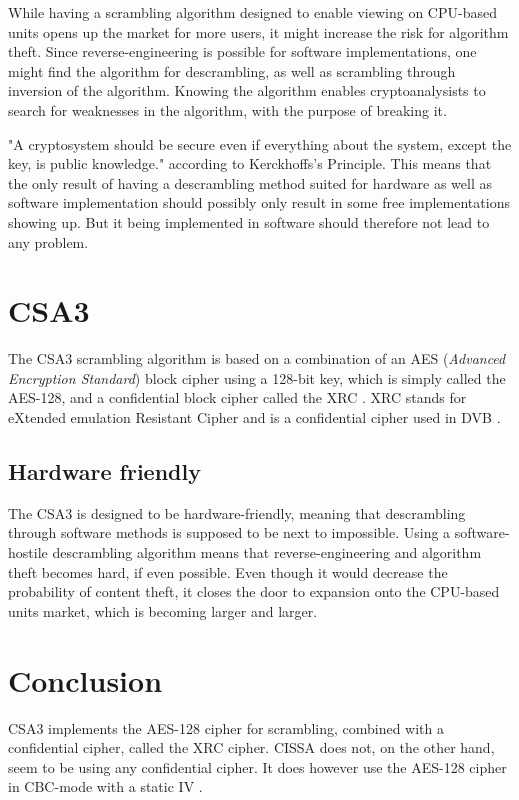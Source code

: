 While having a scrambling algorithm designed to enable viewing on 
CPU-based units opens up the market for more users, it might increase 
the risk for algorithm theft. Since reverse-engineering is possible 
for software implementations, one might find the algorithm for 
descrambling, as well as scrambling through inversion of the algorithm.
Knowing the algorithm enables cryptoanalysists to search for 
weaknesses in the algorithm, with the purpose of breaking it.

"A cryptosystem should be secure even if everything about the system, 
except the key, is public knowledge." according to Kerckhoffs's 
Principle.
This means that the only result of having a descrambling method suited 
for hardware as well as software implementation should possibly only 
result in some free implementations showing up. But it being 
implemented in software should therefore not lead to any problem.


\section{CSA3}
The CSA3 scrambling algorithm is based on a combination of an AES 
(\emph{Advanced Encryption Standard}) block cipher using a 128-bit 
key, which is simply called the AES-128, and a confidential block 
cipher called the XRC \citep[p. 8]{DVB:2013}. XRC stands for eXtended 
emulation Resistant Cipher and is a confidential cipher used in DVB 
\citep[p. 8]{DVB:2013}.

\subsection{Hardware friendly}
The CSA3 is designed to be hardware-friendly, meaning that 
descrambling through software methods is supposed to be next to 
impossible. Using a software-hostile descrambling algorithm means that 
reverse-engineering and algorithm theft becomes hard, if even possible.
Even though it would decrease the probability of content theft, it 
closes the door to expansion onto the CPU-based units market, which is 
becoming larger and larger.

\section{Conclusion}
CSA3 implements the AES-128 cipher for scrambling, combined with a 
confidential cipher, called the XRC cipher. CISSA does not, on the 
other hand, seem to be using any confidential cipher. It does however 
use the AES-128 cipher in CBC-mode with a static IV \citep{DVB:2013}.

